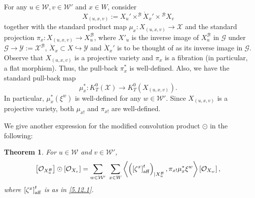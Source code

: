 \documentclass{article}
\newtheorem{theorem}{Theorem}[section]
\def\G{\mathcal{G}}
\def\X{\mathcal{X}}
\def\B{\mathcal{B}}
\def\W{\mathcal{W}}
\def\Y{\mathcal{Y}}
\def\aff{\rm{aff}}
\begin{document}
For any $u\in \W, v\in \W'$ and $x\in W$, consider 
$$ X_{(u,x,v)} := X_u' \times^{\B}\mathring{X}_x' \times{^\B} X_v $$
 together with the standard product map $\mu_x:X_{(u,x,v)}\rightarrow\X$ and the standard projection $\pi_x: X_{(u,x,v)}\rightarrow X_{u}^\B$, where $X'_u$ is the inverse image of $X_u^\B$ in $\G$ under $\G\rightarrow \Y:=\X^\B$, 
$\mathring{X}_x \subset X\hookrightarrow \Y$ and $\mathring{X}_x'$ is to be thought of as its inverse image in $\G$. 
Observe that $X_{(u,x,v)}$ is a projective variety and  $\pi_x$ is a fibration (in particular, a flat morphism). Thus, the pull-back $\pi_x^*$ is well-defined. Also, we have the standard pull-back map
$$
\mu_x^*:K_T^0\left(\X\right) \rightarrow K_T^0\left( X_{(u,x,v)}\right).
$$
In particular, $\mu_x^* \left(\xi^w\right)$ is well-defined for any $w\in \W'$. Since $ X_{(u,x,v)}$ is a projective variety, both $\mu_{x!}$ and $\pi_{x!}$ are well-defined. 


We give another expression for the modified convolution product $\odot$ in the following:
\begin{theorem}\label{5.15}
For $u\in\W$ and $v\in\W'$, 
$$
\left[\mathcal{O}_{X_u^\B}\right]\odot\left[\mathcal{O}_{X_v}\right] =\sum_{w\in \W'}\,\,\sum_{x\in W} \left\langle \left( \left[ \zeta^x\right]^t_{\aff} \right)_{|X_u^\B},\pi_{x!}\mu_x^*\xi^w\right\rangle\left[\mathcal{O}_{X_w}\right],
$$
where $\left[ \zeta^x\right]^t_{\aff}$ is as in \eqref{5.12.1}. 
\end{theorem}
\end{document}

